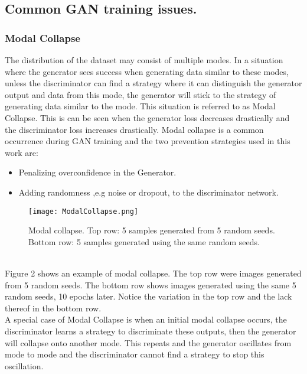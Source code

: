 \documentclass[conference]{IEEEtran}
\begin{document}
    \subsection{Common GAN training issues.}
    
\subsubsection{Modal Collapse}
The distribution of the dataset may consist of multiple modes. In a situation where the generator sees success when generating data similar to these modes, unless the discriminator can find a strategy where it can distinguish the generator output and data from this mode, the generator will stick to the strategy of generating data similar to the mode. This situation is referred to as Modal Collapse. This is can be seen when the generator loss decreases drastically and the discriminator loss increases drastically. Modal collapse is a common occurrence during GAN training and the two prevention strategies used in this work are: \\
\begin{itemize}
    \item Penalizing overconfidence in the Generator.
    \item Adding randomness ,e.g noise or dropout, to the discriminator network. 
    
\end{itemize}

\begin{figure}
    \centering
    \texttt{[image: ModalCollapse.png]}
    \caption{Modal collapse. Top row: 5 samples generated from 5 random seeds. Bottom row: 5 samples generated using the same random seeds. }
    \label{fig:my_label}
\end{figure}\\
Figure 2 shows an example of modal collapse. The top row were images generated from 5 random seeds. The bottom row shows images generated using the same 5 random seeds, 10 epochs later. Notice the variation in the top row and the lack thereof in the bottom row.  \\


A special case of Modal Collapse is when an initial modal collapse occurs, the discriminator learns a strategy to discriminate these outputs, then the generator will collapse onto another mode. This repeats and the generator oscillates from mode to mode and the discriminator cannot find a strategy to stop this oscillation.\\
\end{document}
